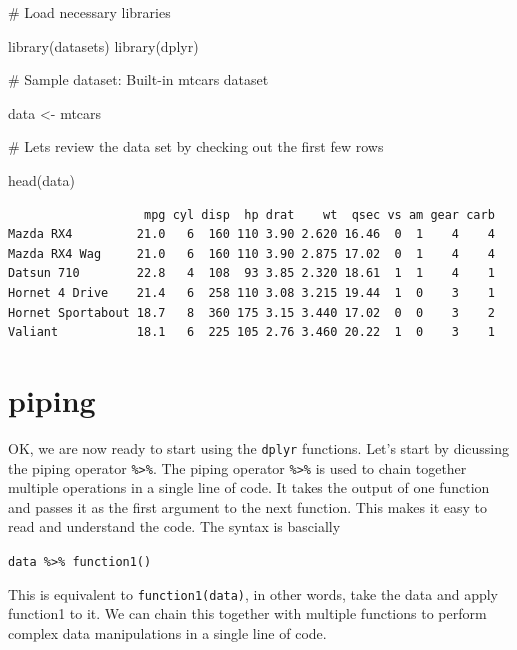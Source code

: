 \documentclass[
  letterpaper,
  DIV=11,
  numbers=noendperiod]{scrreprt}
\newenvironment{Shaded}{\begin{snugshade}}{\end{snugshade}}
\newcommand{\CommentTok}[1]{\textcolor[rgb]{0.37,0.37,0.37}{#1}}
\newcommand{\FunctionTok}[1]{\textcolor[rgb]{0.28,0.35,0.67}{#1}}
\newcommand{\NormalTok}[1]{\textcolor[rgb]{0.00,0.23,0.31}{#1}}
\newcommand{\OtherTok}[1]{\textcolor[rgb]{0.00,0.23,0.31}{#1}}
\begin{document}
\begin{Shaded}
\begin{Highlighting}[]
\CommentTok{\# Load necessary libraries}

\FunctionTok{library}\NormalTok{(datasets)}
\FunctionTok{library}\NormalTok{(dplyr)}

\CommentTok{\# Sample dataset: Built{-}in mtcars dataset}

\NormalTok{data }\OtherTok{\textless{}{-}}\NormalTok{ mtcars}

\CommentTok{\# Let\textquotesingle{}s review the data set by checking out the first few rows}

\FunctionTok{head}\NormalTok{(data)}
\end{Highlighting}
\end{Shaded}

\begin{verbatim}
                   mpg cyl disp  hp drat    wt  qsec vs am gear carb
Mazda RX4         21.0   6  160 110 3.90 2.620 16.46  0  1    4    4
Mazda RX4 Wag     21.0   6  160 110 3.90 2.875 17.02  0  1    4    4
Datsun 710        22.8   4  108  93 3.85 2.320 18.61  1  1    4    1
Hornet 4 Drive    21.4   6  258 110 3.08 3.215 19.44  1  0    3    1
Hornet Sportabout 18.7   8  360 175 3.15 3.440 17.02  0  0    3    2
Valiant           18.1   6  225 105 2.76 3.460 20.22  1  0    3    1
\end{verbatim}

\section*{piping}\label{piping}


OK, we are now ready to start using the \texttt{dplyr} functions. Let's
start by dicussing the piping operator \texttt{\%\textgreater{}\%}. The
piping operator \texttt{\%\textgreater{}\%} is used to chain together
multiple operations in a single line of code. It takes the output of one
function and passes it as the first argument to the next function. This
makes it easy to read and understand the code. The syntax is bascially

\texttt{data\ \%\textgreater{}\%\ function1()}

This is equivalent to \texttt{function1(data)}, in other words, take the
data and apply function1 to it. We can chain this together with multiple
functions to perform complex data manipulations in a single line of
code.
\end{document}
